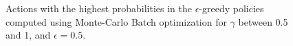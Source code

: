 \documentclass[10pt]{article}   	%
\begin{document}
\begin{figure}[ht!]
     \begin{center}
%
    \end{center}
    \caption{%
        Actions with the highest probabilities in the $\epsilon$-greedy policies computed using Monte-Carlo Batch optimization for $\gamma$ between 0.5 and 1, and $\epsilon=0.5$. 
     }%
   \label{fig:gammacomp}
\end{figure}
\end{document}
